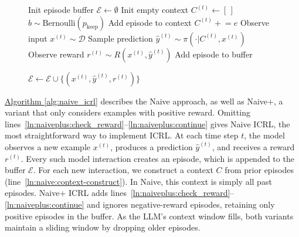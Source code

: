 \documentclass{article}
\theoremstyle{plain}
\theoremstyle{definition}
\theoremstyle{remark}
\newcommand{\autorefalg}[1]{\hyperref[#1]{Algorithm \ref*{#1}}}
\newcommand{\episodeset}{\mathcal{E}}
\newcommand{\episode}{e}
\newcommand{\context}{C}
\newcommand{\example}{x}
\newcommand{\prediction}{y}
\newcommand{\datadist}{\mathcal{D}}
\newcommand{\rewardfunc}{R}
\newcommand{\reward}{r}
\newcommand{\keepprob}{p_\text{keep}}
\newcommand{\policy}{\pi}
\newcommand{\naive}{Naive ICRL\xspace}
\newcommand{\naiveplus}{Naive+ ICRL\xspace}
\newcommand{\naiveshort}{Naive\xspace}
\newcommand{\naiveplusshort}{Naive+\xspace}
\begin{document}
\begin{figure}[t]
\begin{minipage}[t]{0.475\textwidth}
\begin{algorithm}[H]
\begin{algorithmic}[1]
                \STATEX
                \STATE Init episode buffer $\episodeset \gets \emptyset$
                    \STATE Init empty context $\context^{(t)} \gets [\,]$ \label{ln:eicrl:initc}
                    \FOR{$\episode \in \episodeset$}\label{ln:eicrl:context_loop_start}
                        \STATE $b \sim \text{Bernoulli}(\keepprob)$
                            \STATE Add episode to context $\context^{(t)} \mathrel{+}= \episode$
                        \ENDIF
                    \ENDFOR\label{ln:eicrl:context_loop_end}
                    \STATE Observe input $\example^{(t)} \sim \datadist$
                    \STATE Sample prediction $\hat{\prediction}^{(t)} \sim \policy( \cdot \vert \context^{(t)}, \example^{(t)})$ \label{ln:eicrl:prediction}
                    \STATE Observe reward $\reward^{(t)} \sim \rewardfunc(\example^{(t)}, \hat{\prediction}^{(t)})$
                     \label{ln:eicrl:reward_cond}
                        \STATE Add episode to buffer \par \hspace{1em}  $\episodeset \gets \episodeset \cup \{(\example^{(t)}, \hat{\prediction}^{(t)}, \reward^{(t)})\}$
                    \ENDIF\label{ln:eicrl:add_episode}
                \ENDFOR
            \end{algorithmic}
        \end{algorithm}
    \end{minipage}
\vspace{-10pt}
\end{figure}
\autorefalg{alg:naive_icrl} describes the \naiveshort approach, as well as \naiveplusshort, a variant that only considers examples with positive reward.
Omitting lines~\ref{ln:naiveplus:check_reward}--\ref{ln:naiveplus:continue} gives \naive, the most straightforward way to implement ICRL.
At each time step $t$, the model observes a new example $\example^{(t)}$, produces a prediction $\hat{\prediction}^{(t)}$, and receives a reward $\reward^{(t)}$.
Every such model interaction creates an episode, which is appended to the buffer $\episodeset$.
For each new interaction, we construct a context $\context$ from prior episodes (line~\ref{ln:naive:context-construct}).  In \naiveshort, this context is simply all past episodes.
\naiveplus adds lines~\ref{ln:naiveplus:check_reward}--\ref{ln:naiveplus:continue} and ignores negative-reward episodes, retaining only positive episodes in the buffer. As the LLM’s context window fills, both variants maintain a sliding window by dropping older episodes.
\end{document}
